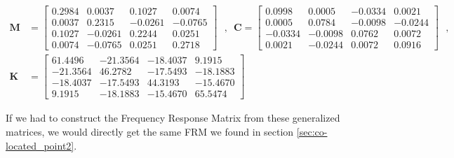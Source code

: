 \documentclass[a4paper,12pt,oneside]{article}
\begin{document}
\[ \begin{split}
	\mathbf{M} & =	\begin{bmatrix}
										0.2984	& 0.0037	& 0.1027	& 0.0074 \\
										0.0037	& 0.2315	& -0.0261	& -0.0765 \\
										0.1027	& -0.0261	& 0.2244	& 0.0251 \\
										0.0074	& -0.0765	& 0.0251	& 0.2718
									\end{bmatrix} \text{~ , ~}
		\mathbf{C} =	\begin{bmatrix}
											0.0998	& 0.0005	& -0.0334	& 0.0021 \\
											0.0005	& 0.0784	& -0.0098	& -0.0244 \\
											-0.0334	& -0.0098	& 0.0762	& 0.0072 \\
											0.0021	& -0.0244	& 0.0072	& 0.0916
										\end{bmatrix} \text{~ , ~} \\[10pt]
	\mathbf{K} & =	\begin{bmatrix}
										61.4496		& -21.3564	& -18.4037	& 9.1915 \\
										-21.3564	& 46.2782		& -17.5493	& -18.1883 \\
										-18.4037	& -17.5493	& 44.3193		& -15.4670 \\
										9.1915		& -18.1883	& -15.4670	& 65.5474
									\end{bmatrix}
\end{split} \]

If we had to construct the Frequency Response Matrix from these generalized matrices, we would directly get the same FRM we found in section \ref{sec:co-located_point2}.
\end{document}
